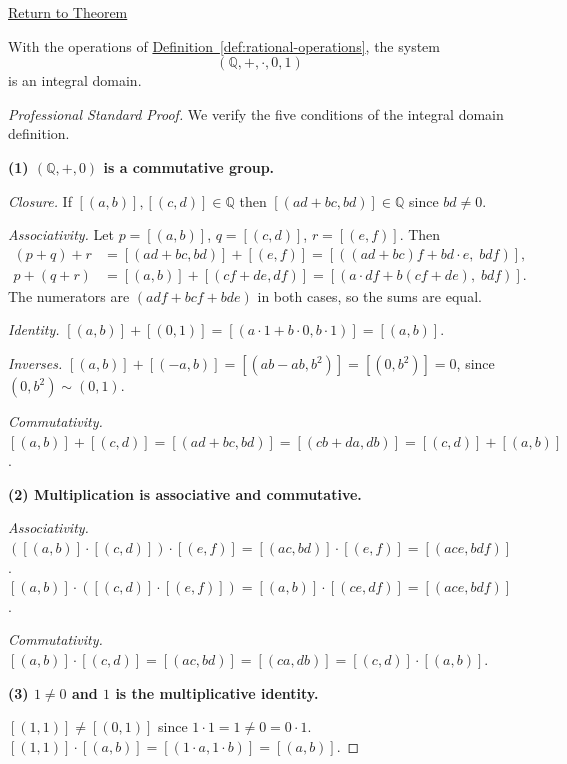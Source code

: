 \newpage
{}
\label{prf:q-is-integral-domain}

\begin{remark*}[Return]
\hyperref[thm:q-is-integral-domain]{Return to Theorem}
\end{remark*}

\begin{theorem*}
With the operations of
\hyperref[def:rational-operations]{Definition~\ref*{def:rational-operations}},
the system
\[
(\mathbb{Q},+,\cdot,0,1)
\]
is an integral domain.
\end{theorem*}

\begin{proof}[Professional Standard Proof]
\LRAProofBodyStart
We verify the five conditions of the integral domain definition.

\textbf{(1) $(\mathbb{Q},+,0)$ is a commutative group.}

\emph{Closure.} If $[(a,b)],[(c,d)]\in\mathbb{Q}$ then
$[(ad+bc,bd)]\in\mathbb{Q}$ since $bd\neq 0$.

\emph{Associativity.} Let $p = [(a,b)]$, $q = [(c,d)]$, $r = [(e,f)]$.
Then
\begin{align*}
(p+q)+r &= [(ad+bc,bd)] + [(e,f)] = [((ad+bc)f + bd\cdot e,\; bdf)], \\
p+(q+r) &= [(a,b)] + [(cf+de,df)] = [(a\cdot df + b(cf+de),\; bdf)].
\end{align*}
The numerators are $(adf + bcf + bde)$ in both cases, so the sums are equal.

\emph{Identity.} $[(a,b)] + [(0,1)] = [(a\cdot 1 + b\cdot 0, b\cdot 1)] = [(a,b)]$.

\emph{Inverses.} $[(a,b)] + [(-a,b)] = [(ab - ab, b^2)] = [(0,b^2)] = 0$,
since $(0,b^2)\sim(0,1)$.

\emph{Commutativity.} $[(a,b)]+[(c,d)] = [(ad+bc,bd)] = [(cb+da,db)] = [(c,d)]+[(a,b)]$.

\textbf{(2) Multiplication is associative and commutative.}

\emph{Associativity.}
$([(a,b)]\cdot[(c,d)])\cdot[(e,f)] = [(ac,bd)]\cdot[(e,f)] = [(ace,bdf)]$.
$[(a,b)]\cdot([(c,d)]\cdot[(e,f)]) = [(a,b)]\cdot[(ce,df)] = [(ace,bdf)]$.

\emph{Commutativity.}
$[(a,b)]\cdot[(c,d)] = [(ac,bd)] = [(ca,db)] = [(c,d)]\cdot[(a,b)]$.

\textbf{(3) $1\neq 0$ and $1$ is the multiplicative identity.}

$[(1,1)]\neq[(0,1)]$ since $1\cdot 1 = 1\neq 0 = 0\cdot 1$.
$[(1,1)]\cdot[(a,b)] = [(1\cdot a, 1\cdot b)] = [(a,b)]$.


\end{proof}
